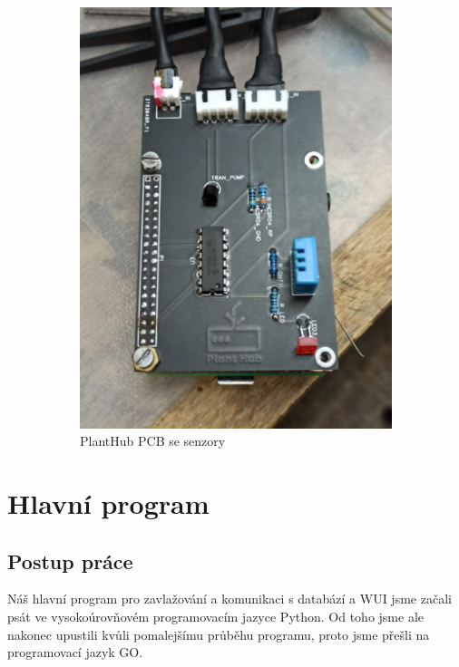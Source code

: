 \documentclass[11pt,a4paper]{article}
\begin{document}
\begin{figure}[h]
\begin{subfigure}[b]{0.4\linewidth}
		\includegraphics[width=\linewidth]{planthub.png}
		\caption{PlantHub PCB se senzory}
	\end{subfigure}
	\caption{}
\end{figure}

\clearpage

\section{Hlavní program}

\subsection{Postup práce}

Náš hlavní program pro zavlažování a komunikaci s databází a WUI
jsme začali psát ve vysokoúrovňovém programovacím jazyce Python. Od toho jsme
ale nakonec upustili kvůli pomalejšímu průběhu programu, proto jsme přešli na
programovací jazyk GO.
\end{document}
